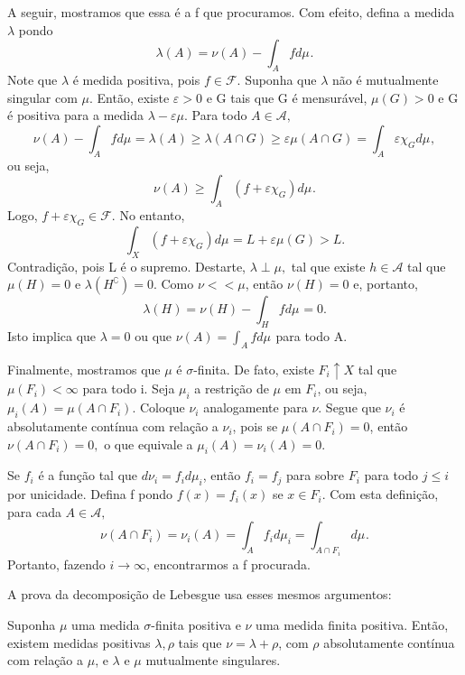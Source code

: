 \documentclass[MeasureTheory/measure_theory.tex]{subfiles}
\begin{document}
\begin{proof*}
	A seguir, mostramos que essa é a f que procuramos. Com efeito, defina a medida \(\lambda \) pondo
	\[
		\lambda (A) = \nu (A) - \int_{A}f d\mu_{}.
	\]
	Note que \(\lambda \) é medida positiva, pois \(f\in \mathcal{F}.\) Suponha que \(\lambda \) não é mutualmente singular com \(\mu \). Então, existe \(\varepsilon >0\) e G tais que G é mensurável, \(\mu (G) > 0\)
	e G é positiva para a medida \(\lambda -\varepsilon \mu .\) Para todo \(A\in \mathcal{A},\)
	\[
		\nu (A) - \int_{A}f d\mu_{} = \lambda (A) \geq \lambda (A\cap G) \geq \varepsilon \mu (A\cap G) = \int_{A}\varepsilon \chi_{G} d\mu_{},
	\]
	ou seja,
	\[
		\nu (A) \geq \int_{A}(f+\varepsilon \chi_{G}) d\mu_{}.
	\]
	Logo, \(f+\varepsilon \chi_{G}\in \mathcal{F}.\) No entanto,
	\[
		\int_{X}(f+\varepsilon \chi_{G}) d\mu_{} = L + \varepsilon \mu (G) > L.
	\]
	Contradição, pois L é o supremo. Destarte, \(\lambda \perp \mu ,\) tal que existe \(h\in \mathcal{A}\) tal que \(\mu (H) = 0\) e \(\lambda (H ^{\complement}) = 0\). Como \(\nu<<\mu \), então \(\nu (H) = 0\) e, portanto,
	\[
		\lambda (H) = \nu (H) - \int_{H}f d\mu_{} = 0.
	\]
	Isto implica que \(\lambda  = 0\) ou que \(\nu (A) = \int_{A}f d\mu_{}\) para todo A.

	Finalmente, mostramos que \(\mu \) é \(\sigma \)-finita. De fato, existe \(F_{i}\uparrow X\) tal que \(\mu (F_{i}) < \infty\) para todo i. Seja \(\mu_{i}\) a restrição de \(\mu \) em \(F_{i}\), ou seja, \(\mu_{i}(A) = \mu(A\cap F_{i})\).
	Coloque \(\nu_{i}\) analogamente para \(\nu \). Segue que \(\nu_{i}\) é absolutamente contínua com relação a \(\nu_{i}\), pois se \(\mu(A\cap F_{i}) = 0\), então \(\nu (A\cap F_{i})=0,\) o que equivale a \(\mu_{i}(A) = \nu_{i}(A) = 0.\)

	Se \(f_{i}\) é a função tal que \(d\nu_{i} = f_{i}d\mu_{i}\), então \(f_{i} = f_{j}\) para sobre \(F_{i}\) para todo \(j\leq i\) por unicidade. Defina f pondo \(f(x) = f_{i}(x)\) se \(x\in F_{i}.\) Com esta definição, para cada \(A\in \mathcal{A},\)
	\[
		\nu (A\cap F_{i}) = \nu_{i}(A) = \int_{A}f_{i} d\mu_{i} = \int_{A\cap F_{i}} d\mu_{}.
	\]
	Portanto, fazendo \(i\to \infty\), encontrarmos a f procurada. \qedsymbol
\end{proof*}
A prova da decomposição de Lebesgue usa esses mesmos argumentos:
\begin{theorem*}
	Suponha \(\mu \) uma medida \(\sigma \)-finita positiva e \(\nu \) uma medida finita positiva. Então, existem medidas positivas \(\lambda , \rho \) tais que \(\nu = \lambda + \rho \), com \(\rho \) absolutamente contínua com relação a \(\mu \), e \(\lambda \) e \(\mu \) mutualmente singulares.
\end{theorem*}
\end{document}
